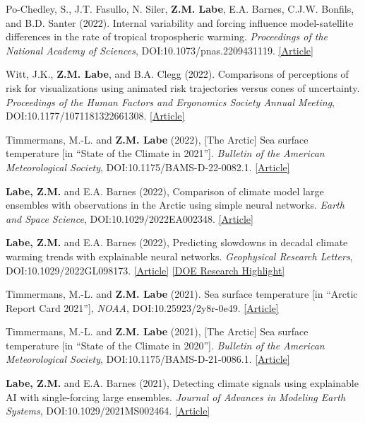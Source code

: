 \documentclass[margin,line,palatino,courier,10pt]{res}
\begin{document}
\begin{resume}
\begin{etaremune}[leftmargin=0in,topsep=0in,parsep=0in]
\item Po-Chedley, S., J.T. Fasullo, N. Siler, \textbf{Z.M. Labe}, E.A. Barnes, C.J.W. Bonfils, and B.D. Santer (2022). Internal variability and forcing influence model-satellite differences in the rate of tropical tropospheric warming. \textit{Proceedings of the National Academy of Sciences}, DOI:10.1073/pnas.2209431119. \href{https://www.pnas.org/doi/10.1073/pnas.2209431119}{[Article]}
\item Witt, J.K., \textbf{Z.M. Labe}, and B.A. Clegg (2022). Comparisons of perceptions of risk for visualizations using animated risk trajectories versus cones of uncertainty. \textit{Proceedings of the Human Factors and Ergonomics Society Annual Meeting}, DOI:10.1177/1071181322661308. \href{https://doi.org/10.1177/1071181322661308}{[Article]}
\item Timmermans, M.-L. and \textbf{Z.M. Labe} (2022), [The Arctic] Sea surface temperature [in ``State of the Climate in 2021'']. \textit{Bulletin of the American Meteorological Society}, DOI:10.1175/BAMS-D-22-0082.1. \href{https://doi.org/10.1175/BAMS-D-22-0082.1}{[Article]}
\item \textbf{Labe, Z.M.} and E.A. Barnes (2022), Comparison of climate model large ensembles with observations in the Arctic using simple neural networks. \textit{Earth and Space Science}, DOI:10.1029/2022EA002348. \href{https://doi.org/10.1029/2022EA002348}{[Article]}
\item \textbf{Labe, Z.M.} and E.A. Barnes (2022), Predicting slowdowns in decadal climate warming trends with explainable neural networks. \textit{Geophysical Research Letters}, DOI:10.1029/2022GL098173. \href{https://doi.org/10.1029/2022GL098173}{[Article]} \href{https://climatemodeling.science.energy.gov/research-highlights/predicting-slowdowns-decadal-climate-warming-trends-explainable-neural-networks}{[DOE Research Highlight]}
\item Timmermans, M.-L. and \textbf{Z.M. Labe} (2021). Sea surface temperature [in ``Arctic Report Card 2021''], \textit{NOAA}, DOI:10.25923/2y8r-0e49. \href{https://www.arctic.noaa.gov/Report-Card/Report-Card-2021/ArtMID/8022/ArticleID/944/Sea-Surface-Temperature}{[Article]}
\item Timmermans, M.-L. and \textbf{Z.M. Labe} (2021), [The Arctic] Sea surface temperature [in ``State of the Climate in 2020'']. \textit{Bulletin of the American Meteorological Society}, DOI:10.1175/BAMS-D-21-0086.1. \href{https://doi.org/10.1175/BAMS-D-21-0086.1}{[Article]}
\item \textbf{Labe, Z.M.} and E.A. Barnes (2021), Detecting climate signals using explainable AI with single-forcing large ensembles. \textit{Journal of Advances in Modeling Earth Systems}, DOI:10.1029/2021MS002464. \href{https://agupubs.onlinelibrary.wiley.com/doi/abs/10.1029/2021MS002464}{[Article]}

\end{etaremune}
\end{resume}
\end{document}
